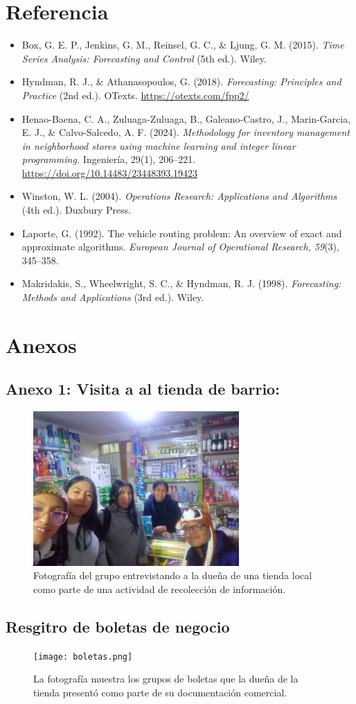 \documentclass[12pt]{article}
\begin{document}
\section{Referencia }
\begin{itemize}
    \item Box, G. E. P., Jenkins, G. M., Reinsel, G. C., \& Ljung, G. M. (2015). \textit{Time Series Analysis: Forecasting and Control} (5th ed.). Wiley.
    \item Hyndman, R. J., \& Athanasopoulos, G. (2018). \textit{Forecasting: Principles and Practice} (2nd ed.). OTexts. \url{https://otexts.com/fpp2/}
    \item Henao-Baena, C. A., Zuluaga-Zuluaga, B., Galeano-Castro, J., Marin-Garcia, E. J., \& Calvo-Salcedo, A. F. (2024). \textit{Methodology for inventory management in neighborhood stores using machine learning and integer linear programming.} Ingeniería, 29(1), 206–221. \url{https://doi.org/10.14483/23448393.19423}
    \item Winston, W. L. (2004). \textit{Operations Research: Applications and Algorithms} (4th ed.). Duxbury Press.
    \item Laporte, G. (1992). The vehicle routing problem: An overview of exact and approximate algorithms. \textit{European Journal of Operational Research, 59}(3), 345–358.
    \item Makridakis, S., Wheelwright, S. C., \& Hyndman, R. J. (1998). \textit{Forecasting: Methods and Applications} (3rd ed.). Wiley.
\end{itemize}

\section{Anexos}
\subsection{Anexo 1: Visita a al tienda de barrio:}
\begin{figure}[H]
    \centering
    \includegraphics[width=0.7\textwidth]{grupo.jpg}
    \caption{Fotografía del grupo entrevistando a la dueña de una tienda local como parte de una actividad de recolección de información.}
\end{figure}
\subsection{Resgitro de boletas de negocio}
\begin{figure}[H]
    \centering
    \texttt{[image: boletas.png]}
    \caption{La fotografía muestra los grupos de boletas que la dueña de la tienda presentó como parte de su documentación comercial.}
\end{figure}
\end{document}
